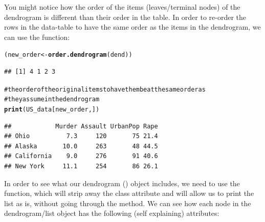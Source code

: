 \documentclass[shortnames,nojss,article]{jss}\usepackage{graphicx, color}
\makeatletter
\newcommand{\hlfunctioncall}[1]{\textcolor[rgb]{0.501960784313725,0,0.329411764705882}{\textbf{#1}}}%
\newcommand{\hlcomment}[1]{\textcolor[rgb]{0.180392156862745,0.6,0.341176470588235}{#1}}%
\newenvironment{kframe}{%
 \def\at@end@of@kframe{}%
 \ifinner\ifhmode%
  \def\at@end@of@kframe{\end{minipage}}%
  \begin{minipage}{\columnwidth}%
 \fi\fi%
 \def\FrameCommand##1{\hskip\@totalleftmargin \hskip-\fboxsep
 \colorbox{shadecolor}{##1}\hskip-\fboxsep
     \hskip-\linewidth \hskip-\@totalleftmargin \hskip\columnwidth}%
 \MakeFramed {\advance\hsize-\width
   \@totalleftmargin\z@ \linewidth\hsize
   \@setminipage}}%
 {\par\unskip\endMakeFramed%
 \at@end@of@kframe}
\newenvironment{knitrout}{}{} %
\makeatother
\begin{document}
You might notice how the order of the items (leaves/terminal nodes) of the dendrogram is different than their order in the table. In order to re-order the rows in the data-table to have the same order as the items in the dendrogram, we can use the  function:

\begin{knitrout}
\color{fgcolor}\begin{kframe}
\begin{alltt}
(new_order <- \hlfunctioncall{order.dendrogram}(dend))
\end{alltt}
\begin{verbatim}
## [1] 4 1 2 3
\end{verbatim}
\begin{alltt}
\hlcomment{# the order of the original items to have them be at the same order as}
\hlcomment{# they assume in the dendrogram}
\hlfunctioncall{print}(US_data[new_order, ])
\end{alltt}
\begin{verbatim}
##            Murder Assault UrbanPop Rape
## Ohio          7.3     120       75 21.4
## Alaska       10.0     263       48 44.5
## California    9.0     276       91 40.6
## New York     11.1     254       86 26.1
\end{verbatim}
\end{kframe}
\end{knitrout}



In order to see what our dendrogram () object includes, we need to use the  function, which will strip away the class attribute and will allow us to print the list as is, without going through the  method. We can see how each node in the dendrogram/list object has the following (self explaining) attributes:
\end{document}
